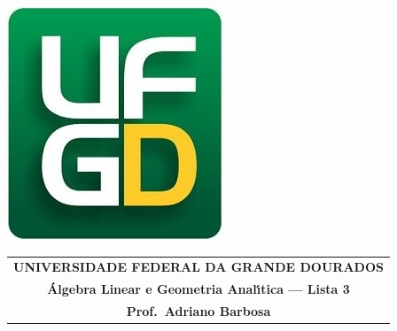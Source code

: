 \documentclass[a4paper,5pt]{amsbook}
\begin{document}
\thispagestyle{empty}
\pagestyle{empty}
\begin{minipage}[h]{0.14\textwidth}
	\includegraphics[scale=0.24]{../../ufgd.png}
\end{minipage}
\begin{minipage}[h]{\textwidth}
\begin{tabular}{c}
{{\bf UNIVERSIDADE FEDERAL DA GRANDE DOURADOS}}\\
{{\bf \'{A}lgebra Linear e Geometria Anal\'{\i}tica --- Lista 3}}\\
{{\bf Prof.\ Adriano Barbosa}}\\
\end{tabular}
\vspace{-0.45cm}
%
\end{minipage}

\end{document}
